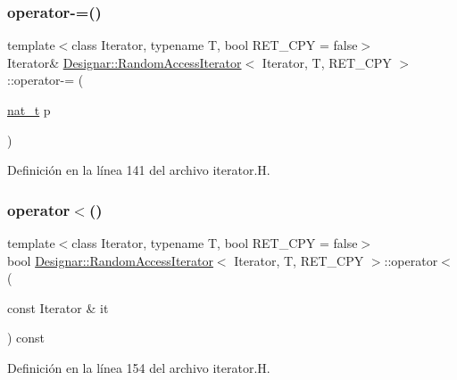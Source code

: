 \subsubsection{\texorpdfstring{operator-\/=()}{operator-=()}}
{\footnotesize\ttfamily template$<$class Iterator, typename T, bool R\+E\+T\+\_\+\+C\+PY = false$>$ \\
Iterator\& \hyperlink{class_designar_1_1_random_access_iterator}{Designar\+::\+Random\+Access\+Iterator}$<$ Iterator, T, R\+E\+T\+\_\+\+C\+PY $>$\+::operator-\/= (\begin{DoxyParamCaption}\item[{\hyperlink{namespace_designar_aa72662848b9f4815e7bf31a7cf3e33d1}{nat\+\_\+t}}]{p }\end{DoxyParamCaption})\hspace{0.3cm}{\ttfamily [inline]}}



Definición en la línea 141 del archivo iterator.\+H.

\mbox{\label{class_designar_1_1_random_access_iterator_ad37f72e55f884ad8f41d4426f2e34d01}} 
\subsubsection{\texorpdfstring{operator$<$()}{operator<()}}
{\footnotesize\ttfamily template$<$class Iterator, typename T, bool R\+E\+T\+\_\+\+C\+PY = false$>$ \\
bool \hyperlink{class_designar_1_1_random_access_iterator}{Designar\+::\+Random\+Access\+Iterator}$<$ Iterator, T, R\+E\+T\+\_\+\+C\+PY $>$\+::operator$<$ (\begin{DoxyParamCaption}\item[{const Iterator \&}]{it }\end{DoxyParamCaption}) const\hspace{0.3cm}{\ttfamily [inline]}}



Definición en la línea 154 del archivo iterator.\+H.

\mbox{\label{class_designar_1_1_random_access_iterator_a1e3696df89803b90124dae7b648bd875}} 
